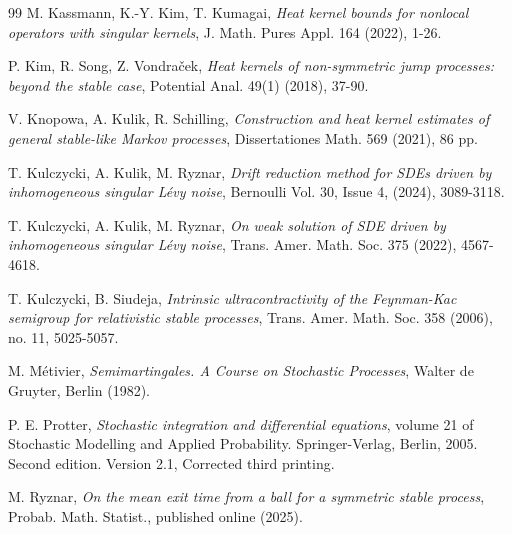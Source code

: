 \documentclass[a4paper,12pt,reqno]{amsart}
\theoremstyle{definition}
\theoremstyle{remark}
\begin{document}
\begin{thebibliography}{99}
 M. Kassmann, K.-Y. Kim, T. Kumagai, \emph{Heat kernel bounds for nonlocal operators with singular kernels}, J. Math. Pures Appl. 164 (2022), 1-26. 

 P. Kim, R. Song, Z. Vondra{\v{c}}ek, \emph{Heat kernels of non-symmetric jump processes: beyond the stable case}, Potential Anal. 49(1) (2018), 37-90.

 V. Knopowa, A. Kulik, R. Schilling, \emph{Construction and heat kernel estimates of general stable-like Markov processes}, Dissertationes Math. 569 (2021), 86 pp.

 T. Kulczycki, A. Kulik, M. Ryznar, \emph{Drift reduction method for SDEs driven by inhomogeneous singular L{\'e}vy noise}, Bernoulli Vol. 30, Issue 4, (2024), 3089-3118.

 T. Kulczycki, A. Kulik, M. Ryznar, \emph{On weak solution of SDE driven by inhomogeneous singular L{\'e}vy noise}, Trans. Amer. Math. Soc. 375 (2022), 4567-4618. 

 T. Kulczycki, B. Siudeja, \emph{Intrinsic ultracontractivity of the Feynman-Kac semigroup for relativistic stable processes},
Trans. Amer. Math. Soc. 358 (2006), no. 11, 5025-5057.

 M. M{\'e}tivier, \emph{Semimartingales. A Course on Stochastic Processes}, Walter de Gruyter, Berlin (1982).


 P. E. Protter, \emph{Stochastic integration and differential equations}, volume 21 of Stochastic Modelling and Applied Probability. Springer-Verlag, Berlin, 2005. Second edition. Version
2.1, Corrected third printing.

 M. Ryznar, \emph{On the mean exit time from a ball for a symmetric stable process},  	Probab. Math. Statist., published online (2025).


\end{thebibliography}
\end{document}
